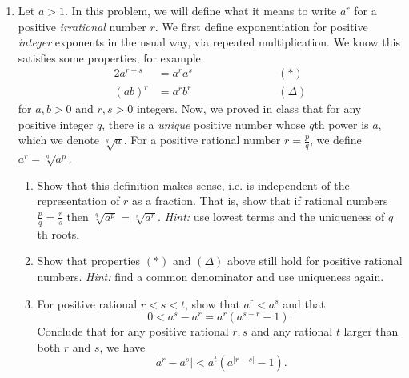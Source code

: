\documentclass[12pt, letterpaper]{article}
\newcommand{\0}{\mathbf{0}}
\newcommand{\1}{\mathbf{1}}
\begin{document}
\begin{enumerate}
\begin{enumerate}
        \item 
        Define 
        \begin{equation*}
            E = \{x \in [-\infty, \infty] : \text{ some subsequence } \{s_{n_k}\} \text{ of } \{s_n\} \text{ converges to } x\}.
        \end{equation*}
        Show that $\displaystyle{\limsup_{n \to \infty} s_n = \sup E}$ and $\displaystyle{\liminf_{n \to \infty} s_n = \inf E}$.\\[5pt] \textit{Hint:} what happens to $\limsup$ and $\liminf$ on subsequences?\\
        
    \end{enumerate}

    \item 
    Let $a > 1$. In this problem, we will define what it means to write $a^r$ for a positive \textit{irrational} number $r$. We first define exponentiation for positive \textit{integer} exponents in the usual way, via repeated multiplication. We know this satisfies some properties, for example
    \begin{alignat*}{2}
        a^{r + s} &= a^r a^s \qquad \qquad \qquad &&(\ast)\\[5pt]
        (ab)^{r} &= a^r b^r \qquad \qquad \qquad &&(\Delta)
    \end{alignat*}
    for $a, b > 0$ and $r, s > 0$ integers. Now, we proved in class that for any positive integer $q$, there is a \textit{unique} positive number whose $q$th power is $a$, which we denote $\sqrt[q]{a}$. For a positive rational number $r = \frac{p}{q}$, we define $a^r = \sqrt[q]{a^p}$.
    \begin{enumerate}
        \item 
        Show that this definition makes sense, i.e. is independent of the representation of $r$ as a fraction. That is, show that if rational numbers $\frac{p}{q} = \frac{r}{s}$ then $\sqrt[q]{a^p} = \sqrt[s]{a^r}$. \textit{Hint:} use lowest terms and the uniqueness of $q$th roots.\\

        \item 
        Show that properties $(\ast)$ and $(\Delta)$ above still hold for positive rational numbers. \textit{Hint:} find a common denominator and use uniqueness again.\\

        \item 
        For positive rational $r < s < t$, show that $a^r < a^s$ and that
        \begin{equation*}
            0 < a^s - a^r = a^r(a^{s - r} - 1).
        \end{equation*}
        Conclude that for any positive rational $r, s$ and any rational $t$ larger than both $r$ and $s$, we have
        \begin{equation*}
            |a^r - a^s| < a^t(a^{|r - s|} - 1).
        \end{equation*}


\end{enumerate}
\end{enumerate}
\end{document}
